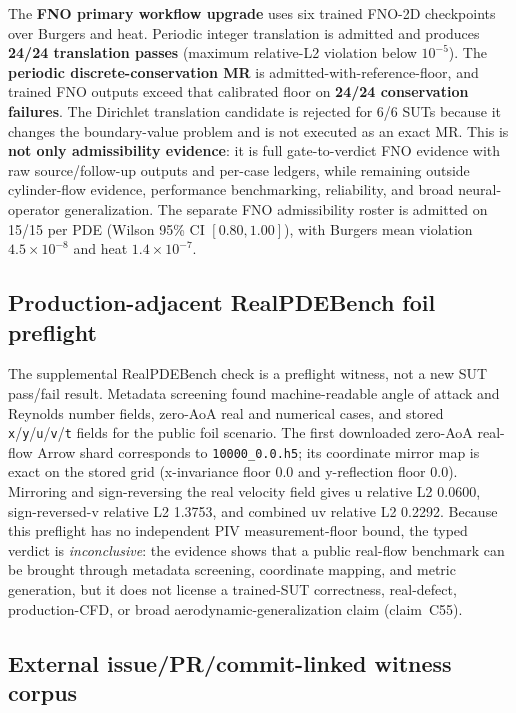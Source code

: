 The \textbf{FNO primary workflow upgrade} uses six trained FNO-2D checkpoints over Burgers and heat. Periodic integer translation is admitted and produces \textbf{24/24 translation passes} (maximum relative-L2 violation below $10^{-5}$). The \textbf{periodic discrete-conservation MR} is admitted-with-reference-floor, and trained FNO outputs exceed that calibrated floor on \textbf{24/24 conservation failures}. The Dirichlet translation candidate is rejected for 6/6 SUTs because it changes the boundary-value problem and is not executed as an exact MR. This is \textbf{not only admissibility evidence}: it is full gate-to-verdict FNO evidence with raw source/follow-up outputs and per-case ledgers, while remaining outside cylinder-flow evidence, performance benchmarking, reliability, and broad neural-operator generalization. The separate FNO admissibility roster is admitted on 15/15 per PDE (Wilson 95\% CI $[0.80, 1.00]$), with Burgers mean violation $4.5\times10^{-8}$ and heat $1.4\times10^{-7}$.

\subsection{Production-adjacent RealPDEBench foil preflight}
\label{subsec:realpdebench-foil-preflight}

The supplemental RealPDEBench check is a preflight witness, not a new SUT
pass/fail result. Metadata screening found machine-readable angle of attack and
Reynolds number fields, zero-AoA real and numerical cases, and stored
\texttt{x}/\texttt{y}/\texttt{u}/\texttt{v}/\texttt{t} fields for the public
foil scenario. The first downloaded zero-AoA real-flow Arrow shard corresponds
to \texttt{10000\_0.0.h5}; its coordinate mirror map is exact on the stored grid
(x-invariance floor 0.0 and y-reflection floor 0.0). Mirroring and
sign-reversing the real velocity field gives u relative L2 0.0600,
sign-reversed-v relative L2 1.3753, and combined uv relative L2 0.2292. Because
this preflight has no independent PIV measurement-floor bound, the typed verdict
is \emph{inconclusive}: the evidence shows that a public real-flow benchmark can
be brought through metadata screening, coordinate mapping, and metric generation,
but it does not license a trained-SUT correctness, real-defect, production-CFD,
or broad aerodynamic-generalization claim (claim~C55).

\subsection{External issue/PR/commit-linked witness corpus}
\label{subsec:external-defect-witness-corpus}

